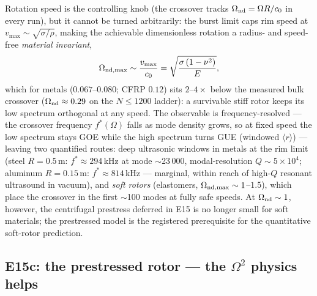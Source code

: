 \documentclass[11pt]{article}
\newcommand{\rmean}{\langle r \rangle}
\begin{document}
Rotation speed is the controlling knob (the crossover tracks
$\Omega_{\rm nd}=\Omega R/c_0$ in every run), but it cannot be turned
arbitrarily: the burst limit caps rim speed at
$v_{\max}\sim\sqrt{\sigma/\rho}$, making the achievable dimensionless
rotation a radius- and speed-free \emph{material invariant},
\[
\Omega_{\rm nd,max} \sim \frac{v_{\max}}{c_0}
 = \sqrt{\frac{\sigma\,(1-\nu^2)}{E}},
\]
which for metals ($0.067$--$0.080$; CFRP $0.12$) sits $2$--$4\times$ below
the measured bulk crossover ($\Omega_{\rm nd}\approx0.29$ on the $N\le1200$
ladder): a survivable stiff rotor keeps its low spectrum orthogonal at any
speed. The observable is frequency-resolved --- the crossover frequency
$f^*(\Omega)$ falls as mode density grows, so at fixed speed the low
spectrum stays GOE while the high spectrum turns GUE (windowed $\rmean$)
--- leaving two quantified routes: deep ultrasonic windows in metals at
the rim limit (steel $R=0.5$\,m: $f^*\approx294$\,kHz at mode
$\sim$23\,000, modal-resolution $Q\sim5\times10^4$; aluminum $R=0.15$\,m:
$f^*\approx814$\,kHz --- marginal, within reach of high-$Q$ resonant
ultrasound in vacuum), and \emph{soft rotors} (elastomers,
$\Omega_{\rm nd,max}\sim1$--$1.5$), which place the crossover in the first
$\sim$100 modes at fully safe speeds. At $\Omega_{\rm nd}\sim1$, however,
the centrifugal prestress deferred in E15 is no longer small for soft
materials; the prestressed model is the registered prerequisite for the
quantitative soft-rotor prediction.

\subsection{E15c: the prestressed rotor --- the $\Omega^2$ physics helps}
\end{document}
